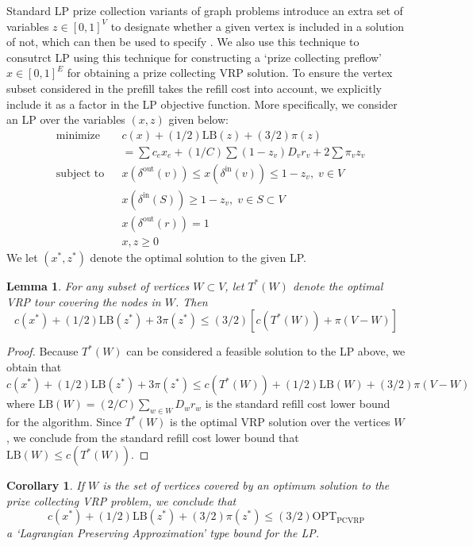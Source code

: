 \documentclass{article}
\theoremstyle{plain}
\newtheorem{lemma}{Lemma}
\newtheorem{corollary}{Corollary}
\theoremstyle{plain}
\begin{document}
Standard LP prize collection variants of graph problems introduce an extra set of variables $z \in [0,1]^V$ to designate whether a given vertex is included in a solution of not, which can then be used to specify . We also use this technique to consutrct LP using this technique for constructing a `prize collecting preflow' $x \in [0,1]^E$ for obtaining a prize collecting VRP solution. To ensure the vertex subset considered in the prefill takes the refill cost into account, we explicitly include it as a factor in the LP objective function. More specifically, we consider an LP over the variables $(x,z)$ given below:
%
\begin{equation*}
\begin{aligned}
& \text{minimize}
& & c(x) + (1/2) \text{LB}(z) + (3/2) \pi(z)\\
& & & = \sum c_ex_e + (1/C) \sum (1 - z_v) D_vr_v + 2\sum \pi_v z_v \\
& \text{subject to} & & x(\delta^{\text{out}}(v)) \leq x(\delta^{\text{in}}(v)) \leq 1 - z_v, \; v \in V\\
& & & x(\delta^{\text{in}}(S)) \geq 1 - z_v, \; v \in S \subset V\\
& & & x(\delta^{\text{out}}(r)) = 1\\
& & & x,z \geq 0
\end{aligned}
\end{equation*}
%
We let $(x^*,z^*)$ denote the optimal solution to the given LP.

\begin{lemma}
    For any subset of vertices $W \subset V$, let $T^*(W)$ denote the optimal VRP tour covering the nodes in $W$. Then
    \[ c(x^*) + (1/2)\text{LB}(z^*) + 3\pi(z^*) \leq (3/2)[c(T^*(W)) + \pi(V-W)] \]
\end{lemma}
\begin{proof}
    Because $T^*(W)$ can be considered a feasible solution to the LP above, we obtain that
    \[ c(x^*) + (1/2) \text{LB}(z^*) + 3 \pi(z^*) \leq c(T^*(W)) + (1/2) \text{LB}(W) + (3/2) \pi(V - W) \]
    where $\text{LB}(W) = (2/C) \sum_{w \in W} D_wr_w$ is the standard refill cost lower bound for the algorithm. Since $T^*(W)$ is the optimal VRP solution over the vertices $W$, we conclude from the standard refill cost lower bound that $\text{LB}(W) \leq c(T^*(W))$.
\end{proof}

\begin{corollary}
    If $W$ is the set of vertices covered by an optimum solution to the prize collecting VRP problem, we conclude that
    \[ c(x^*) + (1/2) \text{LB}(z^*) + (3/2) \pi(z^*) \leq (3/2) \text{OPT}_{\text{PCVRP}} \]
    a `Lagrangian Preserving Approximation' type bound for the LP.
\end{corollary}
\end{document}
